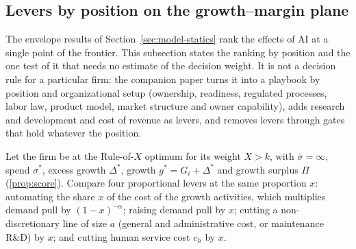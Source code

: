 \subsection{Levers by position on the growth--margin plane}\label{sec:levers-position}

The envelope results of Section~\ref{sec:model-statics} rank the effects of AI at a single point of the frontier. This subsection states the ranking by position and the one test of it that needs no estimate of the decision weight. It is not a decision rule for a particular firm: the companion paper \citep{murthy2026transformation} turns it into a playbook by position and organizational setup (ownership, readiness, regulated processes, labor law, product model, market structure and owner capability), adds research and development and cost of revenue as levers, and removes levers through gates that hold whatever the position.

Let the firm be at the Rule-of-$X$ optimum for its weight $X>k$, with $\bar\sigma=\infty$, spend $\sigma^*$, excess growth $\Delta^*$, growth $g^*=G_i+\Delta^*$ and growth surplus $\Pi$ (\autoref{prop:score}). Compare four proportional levers at the same proportion $x$: automating the share $x$ of the cost of the growth activities, which multiplies demand pull by $(1-x)^{-\alpha}$; raising demand pull by $x$; cutting a non-discretionary line of size $a$ (general and administrative cost, or maintenance R\&D) by $x$; and cutting human service cost $c_h$ by $x$.

